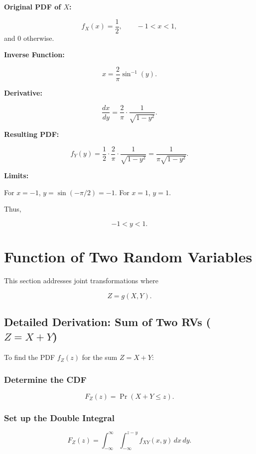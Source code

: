 \documentclass[11pt]{article}
\begin{document}
\textbf{Original PDF of $X$:}

\[
f_X(x) = \frac{1}{2}, \qquad -1 < x < 1,
\]
and $0$ otherwise.

\textbf{Inverse Function:}

\[
x = \frac{2}{\pi}\sin^{-1}(y).
\]

\textbf{Derivative:}

\[
\frac{dx}{dy} = \frac{2}{\pi}\cdot \frac{1}{\sqrt{1-y^2}}.
\]

\textbf{Resulting PDF:}

\[
f_Y(y) = \frac{1}{2}\cdot \frac{2}{\pi}\cdot \frac{1}{\sqrt{1-y^2}}
       = \frac{1}{\pi\sqrt{1-y^2}}.
\]

\textbf{Limits:}

For $x=-1$, $y=\sin(-\pi/2)=-1$.  
For $x=1$, $y=1$.  

Thus,

\[
-1 < y < 1.
\]


\section{Function of Two Random Variables}

This section addresses joint transformations where

\[
Z = g(X,Y).
\]


\subsection{Detailed Derivation: Sum of Two RVs ($Z=X+Y$)}

To find the PDF $f_Z(z)$ for the sum $Z=X+Y$:

\subsubsection{Determine the CDF}

\[
F_Z(z) = \Pr(X+Y \le z).
\]

\subsubsection{Set up the Double Integral}

\[
F_Z(z) = \int_{-\infty}^{\infty}\int_{-\infty}^{z-y}
f_{XY}(x,y)\,dx\,dy.
\]

\end{document}
